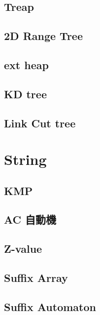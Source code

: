 \subsection{Treap}


\subsection{2D Range Tree}

\subsection{ext heap}

\subsection{KD tree}

\subsection{Link Cut tree}

%

\section{String}

\subsection{KMP}

\subsection{AC 自動機}

\subsection{Z-value}

\subsection{Suffix Array}

\subsection{Suffix Automaton}

